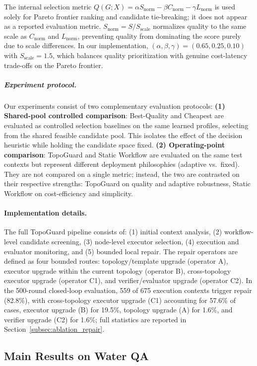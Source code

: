 \documentclass[manuscript,review,anonymous]{acmart}
\begin{document}
The internal selection metric $Q(G;X)=\alpha S_{\text{norm}}-\beta C_{\text{norm}}-\gamma L_{\text{norm}}$ is used solely for Pareto frontier ranking and candidate tie-breaking; it does not appear as a reported evaluation metric. $S_{\text{norm}}=S / S_{\text{scale}}$ normalizes quality to the same scale as $C_{\text{norm}}$ and $L_{\text{norm}}$, preventing quality from dominating the score purely due to scale differences. In our implementation, $(\alpha,\beta,\gamma)=(0.65,0.25,0.10)$ with $S_{\text{scale}}=1.5$, which balances quality prioritization with genuine cost-latency trade-offs on the Pareto frontier.

\subparagraph{Experiment protocol.}\label{subsubsec:exp_protocol}
Our experiments consist of two complementary evaluation protocols:
\textbf{(1) Shared-pool controlled comparison}: Best-Quality and Cheapest are evaluated as controlled selection baselines on the same learned profiles, selecting from the shared feasible candidate pool. This isolates the effect of the decision heuristic while holding the candidate space fixed.
\textbf{(2) Operating-point comparison}: TopoGuard and Static Workflow are evaluated on the same test contexts but represent different deployment philosophies (adaptive vs.\ fixed). They are not compared on a single metric; instead, the two are contrasted on their respective strengths: TopoGuard on quality and adaptive robustness, Static Workflow on cost-efficiency and simplicity.

\paragraph{Implementation details.}
The full TopoGuard pipeline consists of: 
(1) initial context analysis, 
(2) workflow-level candidate screening, 
(3) node-level executor selection, 
(4) execution and evaluator monitoring, and 
(5) bounded local repair. 
The repair operators are defined as four bounded routes: topology/template upgrade (operator A), executor upgrade within the current topology (operator B), cross-topology executor upgrade (operator C1), and verifier/evaluator upgrade (operator C2). In the 500-round closed-loop evaluation, 559 of 675 execution contexts trigger repair (82.8\%), with cross-topology executor upgrade (C1) accounting for 57.6\% of cases, executor upgrade (B) for 19.5\%, topology upgrade (A) for 1.6\%, and verifier upgrade (C2) for 1.6\%; full statistics are reported in Section~\ref{subsec:ablation_repair}.

\subsection{Main Results on Water QA}
\label{subsec:main_results}
\end{document}
